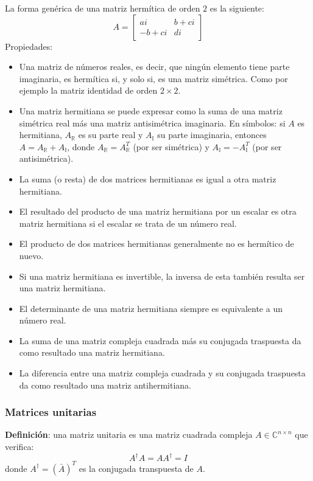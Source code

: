 La forma genérica de una matriz hermítica de orden \(2\) es la siguiente:
\[
A = \begin{bmatrix}
  ai & b + ci \\
  -b+ci & di
\end{bmatrix}
\]
Propiedades:
\begin{itemize}
  \item Una matriz de números reales, es decir, que ningún elemento tiene parte imaginaria, es hermítica si, y solo si, es una matriz simétrica. Como por ejemplo la matriz identidad de orden \(2 \times 2\).
  \item Una matriz hermitiana se puede expresar como la suma de una matriz simétrica real más una matriz antisimétrica imaginaria. En símbolos: si \(A\) es hermitiana, \(A_\mathbb{R}\) es su parte real y \(A_\mathbb{I}\) su parte imaginaria, entonces \(A=A_\mathbb{R} + A_\mathbb{I}\), donde \(A_\mathbb{R} = A_\mathbb{R}^T\) (por ser simétrica) y \(A_\mathbb{I} = - A_\mathbb{I}^T\) (por ser antisimétrica).
  \item La suma (o resta) de dos matrices hermitianas es igual a otra matriz hermitiana.
  \item El resultado del producto de una matriz hermitiana por un escalar es otra matriz hermitiana si el escalar se trata de un número real.
  \item El producto de dos matrices hermitianas generalmente no es hermítico de nuevo.
  \item Si una matriz hermitiana es invertible, la inversa de esta también resulta ser una matriz hermitiana.
  \item El determinante de una matriz hermitiana siempre es equivalente a un número real.
  \item La suma de una matriz compleja cuadrada más su conjugada traspuesta da como resultado una matriz hermitiana.
  \item La diferencia entre una matriz compleja cuadrada y su conjugada traspuesta da como resultado una matriz antihermitiana.
\end{itemize}

\subsubsection{Matrices unitarias}

\textbf{Definición}: una matriz unitaria es una matriz cuadrada compleja \(A \in \mathbb{C}^{n \times n}\) que verifica:
\[
A^\dagger A = A A^\dagger = I
\]
donde \(A^\dagger = (\bar{A})^T\) es la conjugada transpuesta de \(A\).

